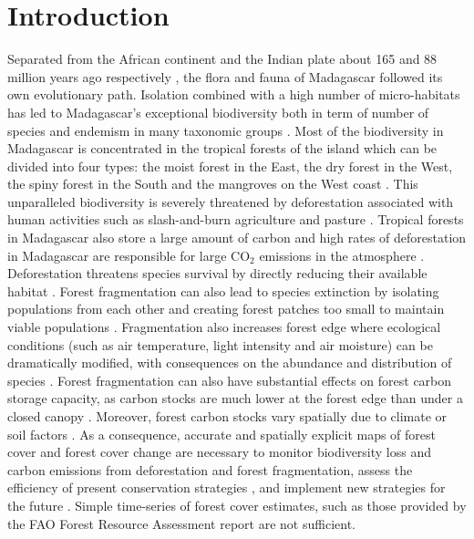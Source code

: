 \documentclass[a4paper, 12pt, leqno]{article}\usepackage[]{graphicx}\usepackage[]{color}
\begin{document}
\newpage

\section{Introduction}
\label{introduction}

Separated from the African continent and the Indian plate about 165
and 88 million years ago respectively \citep{Ali2008}, the flora and
fauna of Madagascar followed its own evolutionary path. Isolation
combined with a high number of micro-habitats \citep{Pearson2009} has
led to Madagascar's exceptional biodiversity both in term of number of
species and endemism in many taxonomic groups \citep{Crottini2012,
  Goodman2005}. Most of the biodiversity in Madagascar is
concentrated in the tropical forests of the island which can be
divided into four types: the moist forest in the East, the dry forest
in the West, the spiny forest in the South and the mangroves on the
West coast \citep{Vieilledent2016}. This unparalleled biodiversity is
severely threatened by deforestation \citep{Harper2007,
  Vieilledent2013} associated with human activities such as slash-and-burn
agriculture and pasture \citep{Scales2011}. Tropical forests in
Madagascar also store a large amount of carbon \citep{Vieilledent2016}
and high rates of deforestation in Madagascar are responsible for
large CO$_2$ emissions in the atmosphere
\citep{Achard2014}. Deforestation threatens species survival by
directly reducing their available habitat \citep{Brooks2002,
  Tidd2001}. Forest fragmentation can also lead to species extinction
by isolating populations from each other and creating forest patches
too small to maintain viable populations
\citep{Saunders1991}. Fragmentation also increases forest edge where
ecological conditions (such as air temperature, light intensity and
air moisture) can be dramatically modified, with consequences on the
abundance and distribution of species \citep{Murcia1995}. Forest
fragmentation can also have substantial effects on forest carbon
storage capacity, as carbon stocks are much lower at the forest edge
than under a closed canopy \citep{Brinck2017}. Moreover, forest
carbon stocks vary spatially due to climate or soil factors
\citep{Saatchi2011, Vieilledent2016}. As a consequence, accurate and
spatially explicit maps of forest cover and forest cover change are
necessary to monitor biodiversity loss and carbon emissions from
deforestation and forest fragmentation, assess the efficiency of
present conservation strategies \citep{Eklund2016}, and implement new
strategies for the future \citep{Vieilledent2013,
  Vieilledent2016}. Simple time-series of forest cover estimates, such
as those provided by the FAO Forest Resource Assessment report
\citep{Keenan2015} are not sufficient.
\end{document}
